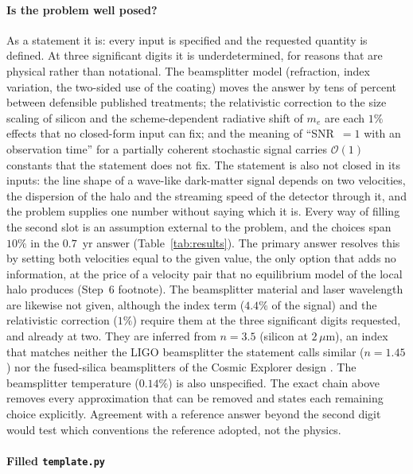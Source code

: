 \paragraph*{Is the problem well posed?}
As a statement it is: every input is specified and the requested quantity is defined. At three significant digits it is underdetermined, for reasons that are physical rather than notational. The beamsplitter model (refraction, index variation, the two-sided use of the coating) moves the answer by tens of percent between defensible published treatments; the relativistic correction to the size scaling of silicon and the scheme-dependent radiative shift of $m_e$ are each $1\%$ effects that no closed-form input can fix; and the meaning of ``SNR~$=1$ with an observation time'' for a partially coherent stochastic signal carries $\mathcal O(1)$ constants that the statement does not fix. The statement is also not closed in its inputs: the line shape of a wave-like dark-matter signal depends on two velocities, the dispersion of the halo and the streaming speed of the detector through it, and the problem supplies one number without saying which it is. Every way of filling the second slot is an assumption external to the problem, and the choices span $10\%$ in the $0.7$~yr answer (Table~\ref{tab:results}). The primary answer resolves this by setting both velocities equal to the given value, the only option that adds no information, at the price of a velocity pair that no equilibrium model of the local halo produces (Step~6 footnote). The beamsplitter material and laser wavelength are likewise not given, although the index term ($4.4\%$ of the signal) and the relativistic correction ($1\%$) require them at the three significant digits requested, and already at two. They are inferred from $n=3.5$ (silicon at $2\,\mu$m), an index that matches neither the LIGO beamsplitter the statement calls similar ($n=1.45$) nor the fused-silica beamsplitters of the Cosmic Explorer design \citep{Evans2021}. The beamsplitter temperature ($0.14\%$) is also unspecified. The exact chain above removes every approximation that can be removed and states each remaining choice explicitly. Agreement with a reference answer beyond the second digit would test which conventions the reference adopted, not the physics.

\paragraph*{Filled \texttt{template.py}}




